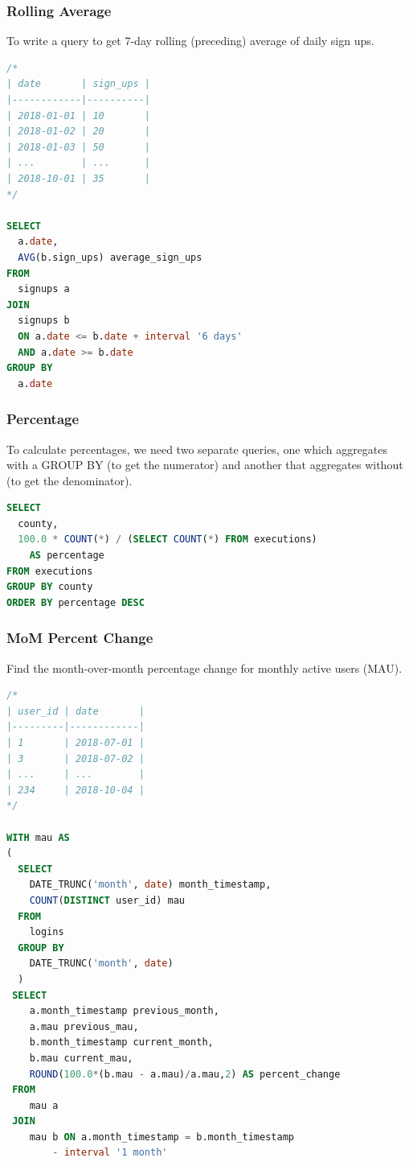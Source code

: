 \documentclass{article}
\begin{document}
\subsubsection{Rolling Average}
To write a query to get 7-day rolling (preceding) average of daily sign ups.

\vspace{8pt} \begin{lstlisting}[language=SQL]
/*
| date       | sign_ups |
|------------|----------|
| 2018-01-01 | 10       |
| 2018-01-02 | 20       |
| 2018-01-03 | 50       |
| ...        | ...      |
| 2018-10-01 | 35       |
*/

SELECT 
  a.date, 
  AVG(b.sign_ups) average_sign_ups 
FROM 
  signups a 
JOIN 
  signups b 
  ON a.date <= b.date + interval '6 days' 
  AND a.date >= b.date
GROUP BY 
  a.date
\end{lstlisting} \vspace{8pt}

\subsubsection{Percentage}

To calculate percentages, we need two separate queries, one which aggregates with a GROUP BY (to get the numerator) and another that aggregates without (to get the denominator). 

\vspace{8pt} \begin{lstlisting}[language=SQL]
SELECT
  county,
  100.0 * COUNT(*) / (SELECT COUNT(*) FROM executions)
    AS percentage
FROM executions
GROUP BY county
ORDER BY percentage DESC
\end{lstlisting} \vspace{8pt}

\subsubsection{MoM Percent Change}
Find the month-over-month percentage change for monthly active users (MAU).

\vspace{8pt} \begin{lstlisting}[language=SQL]
/*
| user_id | date       |
|---------|------------|
| 1       | 2018-07-01 |
| 3       | 2018-07-02 |
| ...     | ...        |
| 234     | 2018-10-04 |
*/

WITH mau AS 
(
  SELECT 
    DATE_TRUNC('month', date) month_timestamp,
    COUNT(DISTINCT user_id) mau
  FROM 
    logins 
  GROUP BY 
    DATE_TRUNC('month', date)
  )
 SELECT 
    a.month_timestamp previous_month, 
    a.mau previous_mau, 
    b.month_timestamp current_month, 
    b.mau current_mau, 
    ROUND(100.0*(b.mau - a.mau)/a.mau,2) AS percent_change 
 FROM
    mau a 
 JOIN 
    mau b ON a.month_timestamp = b.month_timestamp 
        - interval '1 month' 
\end{lstlisting}
\end{document}
